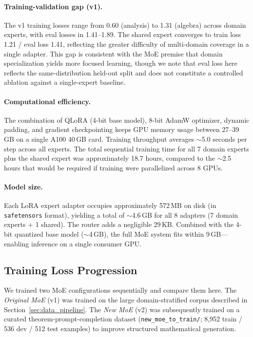 \documentclass[11pt,a4paper]{article}
\begin{document}
\paragraph{Training-validation gap (v1).}
The v1 training losses range from 0.60 (analysis) to 1.31 (algebra) across domain experts, with eval losses in 1.41--1.89. The shared expert converges to train loss 1.21 / eval loss 1.41, reflecting the greater difficulty of multi-domain coverage in a single adapter. This gap is consistent with the MoE premise that domain specialization yields more focused learning, though we note that eval loss here reflects the same-distribution held-out split and does not constitute a controlled ablation against a single-expert baseline.

\paragraph{Computational efficiency.}
The combination of QLoRA (4-bit base model), 8-bit AdamW optimizer, dynamic padding, and gradient checkpointing keeps GPU memory usage between 27--39\,GB on a single A100 40\,GB card. Training throughput averages ${\sim}$5.0 seconds per step across all experts. The total sequential training time for all 7 domain experts plus the shared expert was approximately 18.7 hours, compared to the ${\sim}$2.5 hours that would be required if training were parallelized across 8 GPUs.

\paragraph{Model size.}
Each LoRA expert adapter occupies approximately 572\,MB on disk (in \texttt{safetensors} format), yielding a total of ${\sim}$4.6\,GB for all 8 adapters (7 domain experts + 1 shared). The router adds a negligible 29\,KB. Combined with the 4-bit quantized base model (${\sim}$4\,GB), the full MoE system fits within 9\,GB---enabling inference on a single consumer GPU.

\subsection{Training Loss Progression}

We trained two MoE configurations sequentially and compare them here. The \emph{Original MoE} (v1) was trained on the large domain-stratified corpus described in Section~\ref{sec:data_pipeline}. The \emph{New MoE} (v2) was subsequently trained on a curated theorem-prompt-completion dataset (\texttt{new\_moe\_to\_train/}; 8,952 train / 536 dev / 512 test examples) to improve structured mathematical generation.
\end{document}
